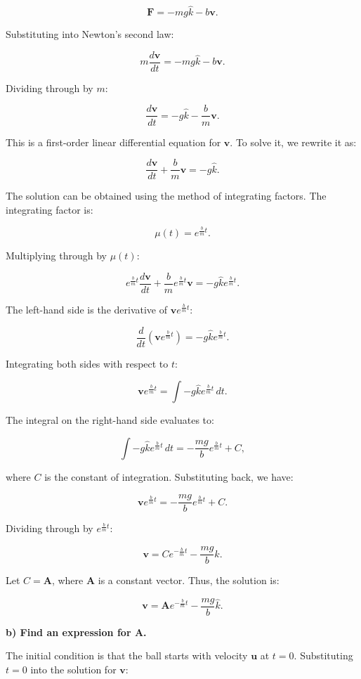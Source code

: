 \documentclass{article}
\begin{document}
\[
\mathbf{F} = -mg\hat{k} - b\mathbf{v}.
\]

Substituting into Newton's second law:

\[
m \frac{d \mathbf{v}}{dt} = -mg\hat{k} - b\mathbf{v}.
\]

Dividing through by $m$:

\[
\frac{d \mathbf{v}}{dt} = -g\hat{k} - \frac{b}{m}\mathbf{v}.
\]

This is a first-order linear differential equation for $\mathbf{v}$. To solve it, we rewrite it as:

\[
\frac{d \mathbf{v}}{dt} + \frac{b}{m}\mathbf{v} = -g\hat{k}.
\]

The solution can be obtained using the method of integrating factors. The integrating factor is:

\[
\mu(t) = e^{\frac{b}{m}t}.
\]

Multiplying through by $\mu(t)$:

\[
e^{\frac{b}{m}t} \frac{d \mathbf{v}}{dt} + \frac{b}{m} e^{\frac{b}{m}t} \mathbf{v} = -g\hat{k} e^{\frac{b}{m}t}.
\]

The left-hand side is the derivative of $\mathbf{v} e^{\frac{b}{m}t}$:

\[
\frac{d}{dt} \left( \mathbf{v} e^{\frac{b}{m}t} \right) = -g\hat{k} e^{\frac{b}{m}t}.
\]

Integrating both sides with respect to $t$:

\[
\mathbf{v} e^{\frac{b}{m}t} = \int -g\hat{k} e^{\frac{b}{m}t} \, dt.
\]

The integral on the right-hand side evaluates to:

\[
\int -g\hat{k} e^{\frac{b}{m}t} \, dt = -\frac{mg}{b} e^{\frac{b}{m}t} + C,
\]

where $C$ is the constant of integration. Substituting back, we have:

\[
\mathbf{v} e^{\frac{b}{m}t} = -\frac{mg}{b} e^{\frac{b}{m}t} + C.
\]

Dividing through by $e^{\frac{b}{m}t}$:

\[
\mathbf{v} = C e^{-\frac{b}{m}t} - \frac{mg}{b} \hat{k}.
\]

Let $C = \mathbf{A}$, where $\mathbf{A}$ is a constant vector. Thus, the solution is:

\[
\mathbf{v} = \mathbf{A} e^{-\frac{b}{m}t} - \frac{mg}{b} \hat{k}.
\]

\textbf{b) Find an expression for $\mathbf{A}$.}

The initial condition is that the ball starts with velocity $\mathbf{u}$ at $t = 0$. Substituting $t = 0$ into the solution for $\mathbf{v}$:
\end{document}
